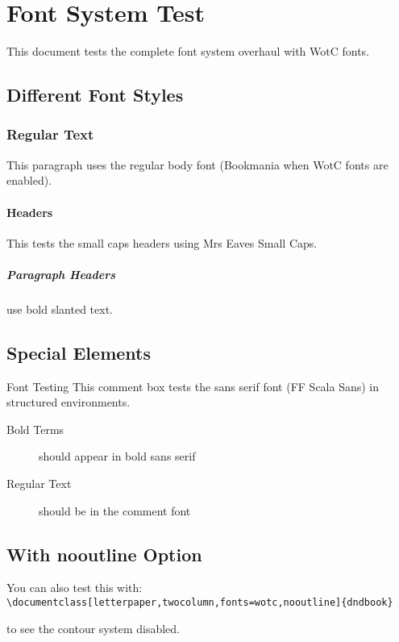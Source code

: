 \documentclass[letterpaper,twocolumn,fonts=wotc]{dndbook}
\begin{document}
\chapter{Font System Test}

This document tests the complete font system overhaul with WotC fonts.

\section{Different Font Styles}

\subsection{Regular Text}
This paragraph uses the regular body font (Bookmania when WotC fonts are enabled).

\subsubsection{Headers}
This tests the small caps headers using Mrs Eaves Small Caps.

\paragraph{Paragraph Headers} use bold slanted text.

\section{Special Elements}


\begin{DndComment}{Font Testing}
This comment box tests the sans serif font (FF Scala Sans) in structured environments.

\begin{description}
  \item[Bold Terms] should appear in bold sans serif
  \item[Regular Text] should be in the comment font
\end{description}
\end{DndComment}

\section{With nooutline Option}

You can also test this with: 
\verb|\documentclass[letterpaper,twocolumn,fonts=wotc,nooutline]{dndbook}|

to see the contour system disabled.
\end{document}
